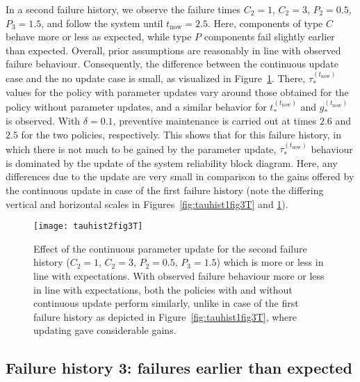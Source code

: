 \documentclass[authoryear]{elsarticle}
\def\tnow{t_\text{now}}
\newcommand{\tausnow}{\tau_*^{(\tnow)}}
\newcommand{\tstarnow}{t_*^{(\tnow)}}
\newcommand{\gstarnow}{g_*^{(\tnow)}}
\begin{document}
In a second failure history, we observe the failure times $C_2 = 1$, $C_2 = 3$, $P_2 = 0.5$, $P_3 = 1.5$,
and follow the system until $\tnow = 2.5$.
Here, components of type $C$ behave more or less as expected,
while type $P$ components fail slightly earlier than expected.
Overall, prior assumptions are reasonably in line with observed failure behaviour.
Consequently, the difference between the continuous update case and the no update case is small,
as visualized in Figure~\ref{fig:tauhist2fig3T}.
There, $\tausnow$ values for the policy with parameter updates vary around those obtained for the policy without parameter updates,
and a similar behavior for $\tstarnow$ and $\gstarnow$ is observed.
With $\delta = 0.1$, preventive maintenance is carried out at times $2.6$ and $2.5$ for the two policies, respectively.
This shows that for this failure history, in which there is not much to be gained by the parameter update,
$\tausnow$ behaviour is dominated by the update of the system reliability block diagram.
Here, any differences due to the update are very small in comparison to the gains offered by the continuous update
in case of the first failure history
(note the differing vertical and horizontal scales in Figures~\ref{fig:tauhist1fig3T} and \ref{fig:tauhist2fig3T}).

\begin{figure}
\texttt{[image: tauhist2fig3T]}
\caption{Effect of the continuous parameter update for the second failure history ($C_2 = 1$, $C_2 = 3$, $P_2 = 0.5$, $P_3 = 1.5$)
which is more or less in line with expectations.
With observed failure behaviour more or less in line with expectations,
both the policies with and without continuous update perform similarly,
unlike in case of the first failure history as depicted in Figure~\ref{fig:tauhist1fig3T},
where updating gave considerable gains.}
\label{fig:tauhist2fig3T}
\end{figure}


\subsection{Failure history 3: failures earlier than expected}
\label{sec:ex-3}
\end{document}
